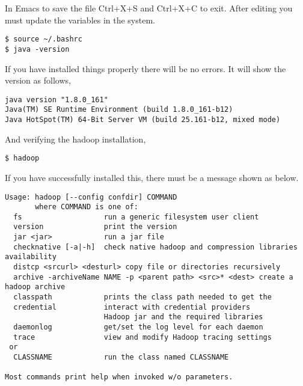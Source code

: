 In Emacs to save the file Ctrl+X+S and Ctrl+X+C to exit. After editing
you must update the variables in the system.

\begin{lstlisting}
$ source ~/.bashrc
$ java -version
\end{lstlisting}

If you have installed things properly there will be no errors. It will
show the version as follows,

\begin{lstlisting}
java version "1.8.0_161"
Java(TM) SE Runtime Environment (build 1.8.0_161-b12)
Java HotSpot(TM) 64-Bit Server VM (build 25.161-b12, mixed mode)
\end{lstlisting}

And verifying the hadoop installation,

\begin{lstlisting}
$ hadoop
\end{lstlisting}

If you have successfully installed this, there must be a message shown
as below.

\begin{lstlisting}
Usage: hadoop [--config confdir] COMMAND
       where COMMAND is one of:
  fs                   run a generic filesystem user client
  version              print the version
  jar <jar>            run a jar file
  checknative [-a|-h]  check native hadoop and compression libraries availability
  distcp <srcurl> <desturl> copy file or directories recursively
  archive -archiveName NAME -p <parent path> <src>* <dest> create a hadoop archive
  classpath            prints the class path needed to get the
  credential           interact with credential providers
                       Hadoop jar and the required libraries
  daemonlog            get/set the log level for each daemon
  trace                view and modify Hadoop tracing settings
 or
  CLASSNAME            run the class named CLASSNAME

Most commands print help when invoked w/o parameters.
\end{lstlisting}
